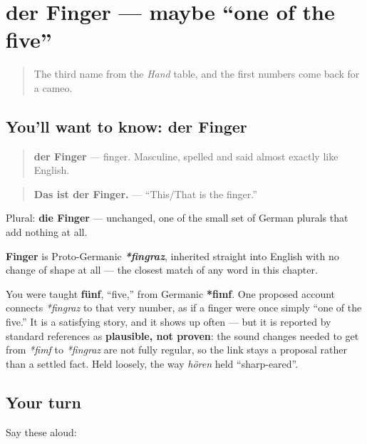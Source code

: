 \section[der Finger]{der Finger — maybe \textquotedblleft{}one of the five\textquotedblright{}}

\label{lesson:GE-C31-finger}



\begin{quote}
The third name from the \emph{Hand} table, and the first numbers come back for a cameo.
\end{quote}

\subsection*{You'll want to know: der Finger}
\begin{quote}
\textbf{der Finger} — finger. Masculine, spelled and said almost exactly like English.
\end{quote}

\begin{quote}
\textbf{Das ist der Finger.} — \textquotedblleft{}This/That is the finger.\textquotedblright{}
\end{quote}

Plural: \textbf{die Finger} — unchanged, one of the small set of German plurals that add nothing at all.

\begin{cousinweb}
\textbf{Finger} is Proto-Germanic \emph{\textbf{*fingraz}}, inherited straight into English with no change of shape at all — the closest match of any word in this chapter.
\end{cousinweb}

\begin{culture}
You were taught \textbf{fünf}, \textquotedblleft{}five,\textquotedblright{} from Germanic \textbf{*fimf}. One proposed account connects \emph{*fingraz} to that very number, as if a finger were once simply \textquotedblleft{}one of the five.\textquotedblright{} It is a satisfying story, and it shows up often — but it is reported by standard references as \textbf{plausible, not proven}: the sound changes needed to get from \emph{*fimf} to \emph{*fingraz} are not fully regular, so the link stays a proposal rather than a settled fact. Held loosely, the way \emph{hören} held \textquotedblleft{}sharp-eared\textquotedblright{}.
\end{culture}

\subsection*{Your turn}
Say these aloud:

